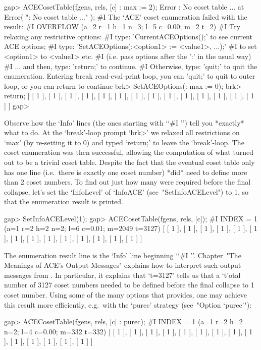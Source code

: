 \beginexample
gap> ACECosetTable(fgens, rels, [c] : max := 2);
Error : No coset table ... at
Error( ": No coset table ..." );
#I  The `ACE' coset enumeration failed with the result:
#I  OVERFLOW (a=2 r=1 h=1 n=3; l=5 c=0.00; m=2 t=2)
#I  Try relaxing any restrictive options:
#I  type: 'CurrentACEOptions();' to see current ACE options;
#I  type: 'SetACEOptions(:<option1> := <value1>, ...);'
#I  to set <option1> to <value1> etc.
#I  (i.e. pass options after the ':' in the usual way)
#I  ... and then, type: 'return;' to continue.
#I  Otherwise, type: 'quit;' to quit the enumeration.
Entering break read-eval-print loop, you can 'quit;' to quit to outer loop,
or you can return to continue
brk> SetACEOptions(: max := 0);
brk> return;
[ [ 1 ], [ 1 ], [ 1 ], [ 1 ], [ 1 ], [ 1 ], [ 1 ], [ 1 ], [ 1 ], [ 1 ], 
  [ 1 ], [ 1 ], [ 1 ], [ 1 ] ]
gap>
\endexample

Observe how the `Info' lines (the  ones  starting  with  \lq{}`\#I '')
tell you *exactly* what to do. At the `break'-loop  prompt  `brk>'  we
relaxed all restrictions on `max' (by re-setting it to  0)  and  typed
`return;' to leave the `break'-loop. The coset  enumeration  was  then
successful, allowing the computation  of  what  turned  out  to  be  a
trivial coset table. Despite the fact that the  eventual  coset  table
only has one line (i.e.~there is  exactly  one  coset  number)  {\ACE}
*did* need to define more than 2 coset numbers. To find out  just  how
many  were  required  before  the  final  collapse,  let's   set   the
`InfoLevel' of `InfoACE' (see~"SetInfoACELevel") to  1,  so  that  the
{\ACE} enumeration result is printed.

\beginexample
gap> SetInfoACELevel(1);
gap> ACECosetTable(fgens, rels, [c]);
#I  INDEX = 1 (a=1 r=2 h=2 n=2; l=6 c=0.01; m=2049 t=3127)
[ [ 1 ], [ 1 ], [ 1 ], [ 1 ], [ 1 ], [ 1 ], [ 1 ], [ 1 ], [ 1 ], [ 1 ], 
  [ 1 ], [ 1 ], [ 1 ], [ 1 ] ]
\endexample

The enumeration result line is the `Info' line beginning \lq{}`\#I ''.
Chapter~"The Meanings  of  ACE's  Output  Messages"  explains  how  to
interpret such output messages from {\ACE}. In particular, it explains
that `t=3127' tells us that a `t'otal number  of  3127  coset  numbers
needed to be defined before the final  collapse  to  1  coset  number.
Using some of the many options that {\ACE} provides, one  may  achieve
this  result  more  efficiently,  e.g.~with   the   `purec'   strategy
(see~"Option `purec'"):

\beginexample
gap> ACECosetTable(fgens, rels, [c] : purec);
#I  INDEX = 1 (a=1 r=2 h=2 n=2; l=4 c=0.00; m=332 t=332)
[ [ 1 ], [ 1 ], [ 1 ], [ 1 ], [ 1 ], [ 1 ], [ 1 ], [ 1 ], [ 1 ], [ 1 ], 
  [ 1 ], [ 1 ], [ 1 ], [ 1 ] ]
\endexample


